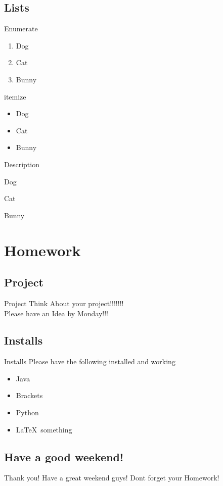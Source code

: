 \documentclass{beamer}
\begin{document}
		\subsection{Lists}
			\begin{frame}{Enumerate}
				\begin{center}
					\begin{enumerate}
						\item Dog 
						\item Cat 
						\item Bunny
					\end{enumerate}
				\end{center}
			\end{frame}
		\begin{frame}{itemize}
			\begin{center}
				\begin{itemize}
					\item Dog 
					\item Cat 
					\item Bunny
				\end{itemize}
			\end{center}
		\end{frame}
	
		\begin{frame}{Description}
			\begin{center}
				\begin{description}
					\item Dog 
					\item Cat 
					\item Bunny
				\end{description}
			\end{center}
		\end{frame}
	
	\section{Homework}
		\subsection{Project}
			\begin{frame}{Project}
				Think About your project!!!!!!!\\
				Please have an Idea by Monday!!!
			\end{frame}
		\subsection{Installs}
			\begin{frame}{Installs}
				Please have the following installed and working 
				\begin{itemize}
					\item Java
					\item Brackets
					\item Python
					\item \LaTeX\ something
				\end{itemize}
			\end{frame}
		\subsection{Have a good weekend!}
			\begin{frame}{Thank you!}
				Have a great weekend guys! Dont forget your Homework!
			\end{frame}
			
		
\end{document}
